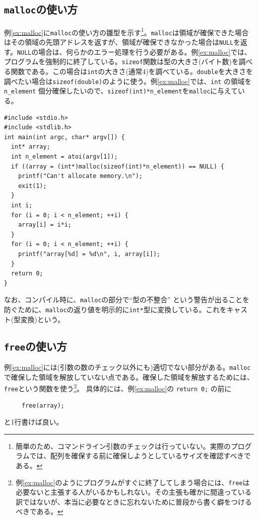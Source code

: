 \subsection{{\tt malloc}の使い方}

例\ref{ex:malloc}に\verb|malloc|の使い方の雛型を示す\footnote{簡単のため、コマンドライン引数のチェックは行っていない。実際のプログラムでは、配列を確保する前に確保しようとしているサイズを確認すべきである。}。\verb|malloc|は領域が確保できた場合はその領域の先頭アドレスを返すが、領域が確保できなかった場合は\verb|NULL|を返す。\verb|NULL|の場合は、何らかのエラー処理を行う必要がある。例\ref{ex:malloc}では、プログラムを強制的に終了している。\verb|sizeof|関数は型の大きさ(バイト数)を調べる関数である。この場合は\verb|int|の大きさ(通常4)を調べている。\verb|double|を大きさを調べたい場合は\verb|sizeof(double)|のように使う。例\ref{ex:malloc}では、\verb|int| の領域を \verb|n_element| 個分確保したいので、\verb|sizeof(int)*n_element|を\verb|malloc|に与えている。
\begin{reidai}\label{ex:malloc}
\begin{verbatim}
#include <stdio.h>
#include <stdlib.h>
int main(int argc, char* argv[]) {
  int* array;
  int n_element = atoi(argv[1]);
  if ((array = (int*)malloc(sizeof(int)*n_element)) == NULL) {
    printf("Can't allocate memory.\n");
    exit(1);
  }
  int i;
  for (i = 0; i < n_element; ++i) {
    array[i] = i*i;
  }
  for (i = 0; i < n_element; ++i) {
    printf("array[%d] = %d\n", i, array[i]);
  }
  return 0;
}
\end{verbatim}
\end{reidai} \noindent
なお、コンパイル時に、{\tt malloc}の部分で``型の不整合'' という警告が出ることを防ぐために、{\tt malloc}の返り値を明示的に{\tt int*}型に変換している。これをキャスト(型変換)という。

\subsection{{\tt free}の使い方}

例\ref{ex:malloc}には(引数の数のチェック以外にも)適切でない部分がある。\verb|malloc|で確保した領域を解放していない点である。確保した領域を解放するためには、\verb|free|という関数を使う\footnote{例\ref{ex:malloc}のようにプログラムがすぐに終了してしまう場合には、{\tt free}は必要ないと主張する人がいるかもしれない。その主張も確かに間違っている訳ではないが、本当に必要なときに忘れないために普段から書く癖をつけるべきである。}。
具体的には、例\ref{ex:malloc}の \verb|return 0;| の前に
\begin{verbatim}
     free(array);
\end{verbatim}
と1行書けば良い。

